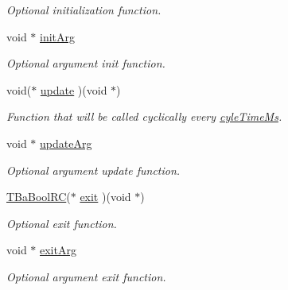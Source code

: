 \begin{DoxyCompactItemize}
\begin{DoxyCompactList}\small\item\em Optional initialization function. \end{DoxyCompactList}\item 
\hypertarget{structTBaApiCtrlTaskOpts_ad3650f49b9a488c420c4c22da3ae1dda}{}void $\ast$ \hyperlink{structTBaApiCtrlTaskOpts_ad3650f49b9a488c420c4c22da3ae1dda}{init\+Arg}\label{structTBaApiCtrlTaskOpts_ad3650f49b9a488c420c4c22da3ae1dda}

\begin{DoxyCompactList}\small\item\em Optional argument init function. \end{DoxyCompactList}\item 
\hypertarget{structTBaApiCtrlTaskOpts_aeb48d712d7cc744807975ec51cdf9f37}{}void($\ast$ \hyperlink{structTBaApiCtrlTaskOpts_aeb48d712d7cc744807975ec51cdf9f37}{update} )(void $\ast$)\label{structTBaApiCtrlTaskOpts_aeb48d712d7cc744807975ec51cdf9f37}

\begin{DoxyCompactList}\small\item\em Function that will be called cyclically every \hyperlink{structTBaApiCtrlTaskOpts_a4a2241999559f0924c70899e6c1e71f3}{cyle\+Time\+Ms}. \end{DoxyCompactList}\item 
\hypertarget{structTBaApiCtrlTaskOpts_a596bfe867887a3d23e7888300708837c}{}void $\ast$ \hyperlink{structTBaApiCtrlTaskOpts_a596bfe867887a3d23e7888300708837c}{update\+Arg}\label{structTBaApiCtrlTaskOpts_a596bfe867887a3d23e7888300708837c}

\begin{DoxyCompactList}\small\item\em Optional argument update function. \end{DoxyCompactList}\item 
\hypertarget{structTBaApiCtrlTaskOpts_a987242de0c1c39f97ff157c918ad7746}{}\hyperlink{BaBool_8h_a84d5a0de4729ca4c89f2479c605dbf3d}{T\+Ba\+Bool\+R\+C}($\ast$ \hyperlink{structTBaApiCtrlTaskOpts_a987242de0c1c39f97ff157c918ad7746}{exit} )(void $\ast$)\label{structTBaApiCtrlTaskOpts_a987242de0c1c39f97ff157c918ad7746}

\begin{DoxyCompactList}\small\item\em Optional exit function. \end{DoxyCompactList}\item 
\hypertarget{structTBaApiCtrlTaskOpts_a4b4f0d49fe18ab1bebd856f2d07f65e3}{}void $\ast$ \hyperlink{structTBaApiCtrlTaskOpts_a4b4f0d49fe18ab1bebd856f2d07f65e3}{exit\+Arg}\label{structTBaApiCtrlTaskOpts_a4b4f0d49fe18ab1bebd856f2d07f65e3}

\begin{DoxyCompactList}\small\item\em Optional argument exit function. \end{DoxyCompactList}\end{DoxyCompactItemize}


